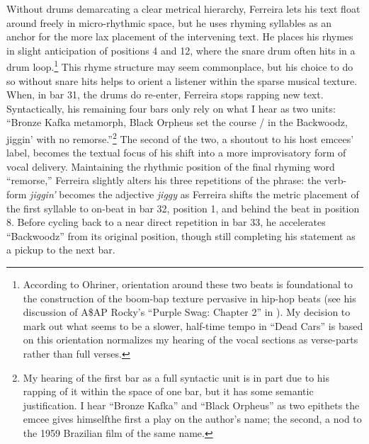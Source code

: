 Without drums demarcating a clear metrical hierarchy, Ferreira lets his text float around freely in 
micro-rhythmic space, but he uses rhyming syllables as an anchor for the more lax placement of the 
intervening text. He places his rhymes in slight anticipation of positions 4 and 12, where the snare
drum often hits in a drum loop.\footnote{
    According to Ohriner, orientation around these two beats is foundational to the 
    construction of the boom-bap texture pervasive in hip-hop beats (see his discussion
    of A\$AP Rocky's ``Purple Swag:  Chapter 2'' in 
    \autocite[18]{mitchellohrinerFlowRhythmicVoice2019}). My decision to mark out what 
    seems to be a slower, half-time tempo in ``Dead Cars'' is based on this orientation
    normalizes my hearing of the vocal sections as verse-parts rather than full verses.}
This rhyme structure may seem commonplace, but his choice to do so without snare hits helps to orient
a listener within the sparse musical texture. When, in bar 31, the drums do re-enter, Ferreira stops
rapping new text. Syntactically, his remaining four bars only rely on what I hear as two units: ``Bronze
Kafka metamorph, Black Orpheus set the course / in the Backwoodz, jiggin' with no remorse.''\footnote{
    My hearing of the first bar as a full syntactic unit is in part due to his rapping 
    of it within the space of one bar, but it has some semantic justification. I hear
    ``Bronze Kafka'' and ``Black Orpheus'' as two epithets the emcee gives 
    himself\textemdash the first a play on the author's name; the second, a nod to the
    1959 Brazilian film of the same name.}
The second of the two, a shoutout to his host emcees' label, becomes the textual focus of his shift into
a more improvisatory form of vocal delivery. Maintaining the rhythmic position of the final rhyming word
``remorse,'' Ferreira slightly alters his three repetitions of the phrase: the verb-form \textit{jiggin'}
becomes the adjective \textit{jiggy} as Ferreira shifts the metric placement of the first syllable to 
on-beat in bar 32, position 1, and behind the beat in position 8. Before cycling back to a near direct 
repetition in bar 33, he accelerates ``Backwoodz'' from its original position, though still completing his
statement as a pickup to the next bar.


